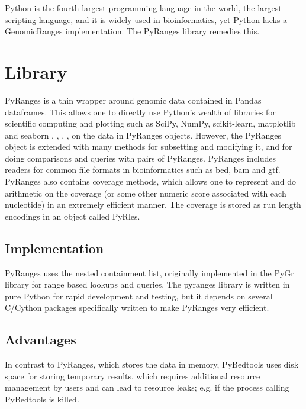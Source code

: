 \documentclass[10pt,letterpaper]{article}
\begin{document}
Python is the fourth largest programming language in the world, the largest
scripting language, and it is widely used in bioinformatics, yet Python lacks a
GenomicRanges implementation. The PyRanges library remedies this.

\section*{Library}

PyRanges is a thin wrapper around genomic data contained in Pandas
\cite{mckinney-proc-scipy-2010} dataframes. This allows one to directly use
Python's wealth of libraries for scientific computing and plotting such as
SciPy, NumPy, scikit-learn, matplotlib and seaborn \cite{scipy},
\cite{oliphant-2006-guide}, \cite{scikit-learn}, \cite{Hunter:2007},
\cite{michael_waskom_2017_883859} on the data in PyRanges objects. However, the
PyRanges object is extended with many methods for subsetting and modifying it,
and for doing comparisons and queries with pairs of PyRanges. PyRanges includes
readers for common file formats in bioinformatics such as bed, bam and gtf.
PyRanges also contains coverage methods, which allows one to represent and do
arithmetic on the coverage (or some other numeric score associated with each
nucleotide) in an extremely efficient manner. The coverage is stored as run
length encodings in an object called PyRles.

\subsection*{Implementation}

PyRanges uses the nested containment list, originally implemented in the PyGr
library \cite{doi:10.1093/bioinformatics/btl647} for range based lookups and
queries. The pyranges library is written in pure Python for rapid development
and testing, but it depends on several C/Cython packages specifically written to
make PyRanges very efficient.

\subsection*{Advantages}

In contrast to PyRanges, which stores the data in memory, PyBedtools uses disk
space for storing temporary results, which requires additional resource
management by users and can lead to resource leaks; e.g. if the process calling
PyBedtools is killed.
\end{document}
